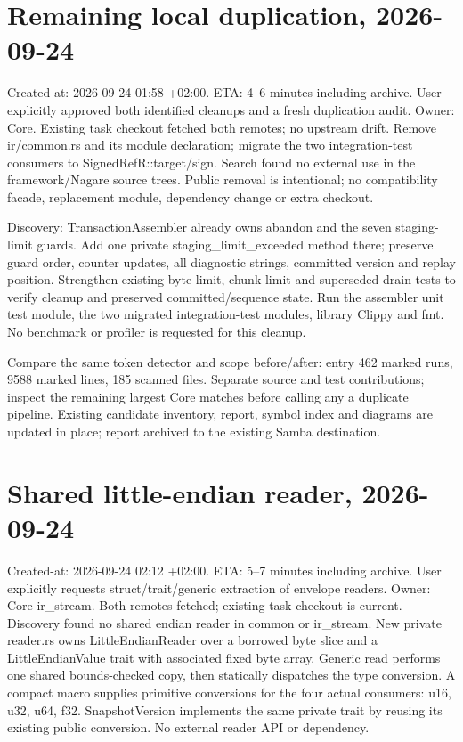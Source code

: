 \documentclass[11pt,a4paper]{article}
\begin{document}
\section*{Remaining local duplication, 2026-09-24}
Created-at: 2026-09-24 01:58 +02:00. ETA: 4--6 minutes including archive.
User explicitly approved both identified cleanups and a fresh duplication audit.
Owner: Core. Existing task checkout fetched both remotes; no upstream drift.
Remove ir/common.rs and its module declaration; migrate the two integration-test
consumers to SignedRefR::target/sign. Search found no external use in the
framework/Nagare source trees. Public removal is intentional; no compatibility
facade, replacement module, dependency change or extra checkout.

Discovery: TransactionAssembler already owns abandon and the seven staging-limit
guards. Add one private staging\_limit\_exceeded method there; preserve guard
order, counter updates, all diagnostic strings, committed version and replay
position. Strengthen existing byte-limit, chunk-limit and superseded-drain tests
to verify cleanup and preserved committed/sequence state. Run the assembler unit
test module, the two migrated integration-test modules, library Clippy and fmt.
No benchmark or profiler is requested for this cleanup.

Compare the same token detector and scope before/after: entry 462 marked runs,
9588 marked lines, 185 scanned files. Separate source and test contributions;
inspect the remaining largest Core matches before calling any a duplicate
pipeline. Existing candidate inventory, report, symbol index and diagrams are
updated in place; report archived to the existing Samba destination.
\section*{Shared little-endian reader, 2026-09-24}
Created-at: 2026-09-24 02:12 +02:00. ETA: 5--7 minutes including archive.
User explicitly requests struct/trait/generic extraction of envelope readers.
Owner: Core ir\_stream. Both remotes fetched; existing task checkout is current.
Discovery found no shared endian reader in common or ir\_stream. New private
reader.rs owns LittleEndianReader over a borrowed byte slice and a
LittleEndianValue trait with associated fixed byte array. Generic read performs
one shared bounds-checked copy, then statically dispatches the type conversion.
A compact macro supplies primitive conversions for the four actual consumers:
u16, u32, u64, f32. SnapshotVersion implements the same private trait by reusing
its existing public conversion. No external reader API or dependency.
\end{document}
